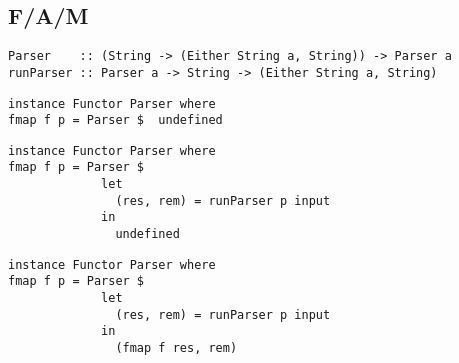 \documentclass{beamer}
\begin{document}
\subsection{F/A/M}
\begin{frame}[fragile]
\begin{verbatim}
Parser    :: (String -> (Either String a, String)) -> Parser a
runParser :: Parser a -> String -> (Either String a, String)
\end{verbatim}
\begin{overprint}
\begin{verbatim}
instance Functor Parser where
fmap f p = Parser $  undefined
\end{verbatim}
\begin{verbatim}
instance Functor Parser where
fmap f p = Parser $ 
             let
               (res, rem) = runParser p input
             in
               undefined
\end{verbatim}
\begin{verbatim}
instance Functor Parser where
fmap f p = Parser $ 
             let
               (res, rem) = runParser p input
             in
               (fmap f res, rem)
\end{verbatim}
\end{overprint}
\end{frame}
\end{document}
